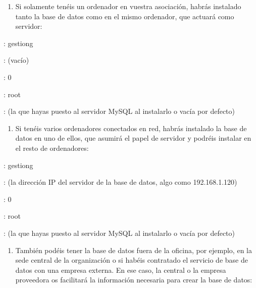 \liststyleLv
\begin{enumerate}
\item Si solamente tenéis un ordenador en vuestra asociación,
habrás instalado tanto la base de datos como \appname en el mismo
ordenador, que actuará como servidor:
\end{enumerate}

: gestiong

: (vacío)

: 0

: root

: (la que
hayas puesto al servidor MySQL al instalarlo o vacía por defecto)

\liststyleLv
\setcounter{saveenum}{\value{enumi}}
\begin{enumerate}
\setcounter{enumi}{\value{saveenum}}
\item Si tenéis varios ordenadores conectados en red, habrás
instalado la base de datos en uno de ellos, que asumirá el papel de
servidor y podréis instalar \appname en el resto de ordenadores:
\end{enumerate}

: gestiong

: (la dirección
IP del servidor de la base de datos, algo como 192.168.1.120)

: 0

: root 

: (la que
hayas puesto al servidor MySQL al instalarlo o vacía por defecto)

\liststyleLv
\setcounter{saveenum}{\value{enumi}}
\begin{enumerate}
\setcounter{enumi}{\value{saveenum}}
\item También podéis tener la base de datos fuera de la oficina, por
ejemplo, en la sede central de la organización o si habéis
contratado el servicio de base de datos con una empresa externa. En ese
caso, la central o la empresa proveedora os facilitará la
información necesaria para crear la base de datos:
\end{enumerate}

